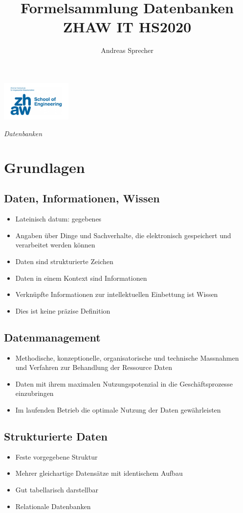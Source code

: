 \documentclass[8pt,a4paper]{scrartcl}
\title{Formelsammlung Datenbanken ZHAW IT HS2020}
\author{Andreas Sprecher}
\begin{document}
	\begin{multicols*}{3}
		\setlength{\columnseprule}{0.4pt}
   		 \parbox{4cm}{
        		\includegraphics[height=2cm]{./img/Logo.jpeg}
  		  }
  		  \parbox{4cm}{
      		  \emph{\Large{Datenbanken}}
   		 }
  		  \vspace{-2mm} 

		\section{Grundlagen}
			\subsection{Daten, Informationen, Wissen}
				\begin{itemize}\itemsep0pt			
					\item Lateinisch datum: gegebenes
					\item Angaben über Dinge und Sachverhalte, die elektronisch gespeichert und verarbeitet werden können
					\item Daten sind strukturierte Zeichen
					\item Daten in einem Kontext sind Informationen
					\item Verknüpfte Informationen zur intellektuellen Einbettung ist Wissen
					\item Dies ist keine präzise Definition
				\end{itemize}
				
			\subsection{Datenmanagement}
				\begin{itemize}\itemsep0pt			
					\item Methodische, konzeptionelle, organisatorische und technische Massnahmen und Verfahren zur Behandlung der Ressource Daten
					\item Daten mit ihrem maximalen Nutzungspotenzial in die Geschäftsprozesse einzubringen
					\item Im laufenden Betrieb die optimale Nutzung der Daten gewährleisten
				\end{itemize}
				
			\subsection{Strukturierte Daten}
				\begin{itemize}\itemsep0pt			
					\item Feste vorgegebene Struktur
					\item Mehrer gleichartige Datensätze mit identischem Aufbau
					\item Gut tabellarisch darstellbar
					\item Relationale Datenbanken
				\end{itemize}
				

\end{multicols*}
\end{document}
